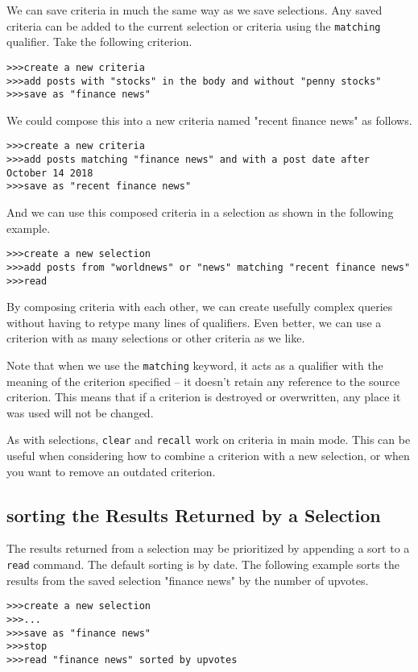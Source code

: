 We can save criteria in much the same way as we save selections. Any saved criteria can be
added to the current selection or criteria using the \texttt{matching} qualifier. Take the following criterion.
\begin{lstlisting}
>>>create a new criteria
>>>add posts with "stocks" in the body and without "penny stocks"
>>>save as "finance news"
\end{lstlisting}
We could compose this into a new criteria named "recent finance news" as follows.
\begin{lstlisting}
>>>create a new criteria
>>>add posts matching "finance news" and with a post date after October 14 2018
>>>save as "recent finance news"
\end{lstlisting}
And we can use this composed criteria in a selection as shown in the following example.
\begin{lstlisting}
>>>create a new selection
>>>add posts from "worldnews" or "news" matching "recent finance news"
>>>read
\end{lstlisting}
By composing criteria with each other, we can create usefully complex queries without having
to retype many lines of qualifiers. Even better, we can use a criterion with as many selections or other criteria as we like.

Note that when we use the \texttt{matching} keyword, it acts as a qualifier with the meaning of the
criterion specified -- it doesn’t retain any reference to the source criterion. This means
that if a criterion is destroyed or overwritten, any place it was used will not be changed.

As with selections, \texttt{clear} and \texttt{recall} work on criteria in main mode. This can be useful when
considering how to combine a criterion with a new selection, or when you want to remove an
outdated criterion.

\subsection{sorting the Results Returned by a Selection}
The results returned from a selection may be prioritized by appending a sort to a \texttt{read} command.
The default sorting is by date. The following example sorts the results from the saved selection
"finance news" by the number of upvotes.
\begin{lstlisting}
>>>create a new selection
>>>...
>>>save as "finance news"
>>>stop
>>>read "finance news" sorted by upvotes
\end{lstlisting}
